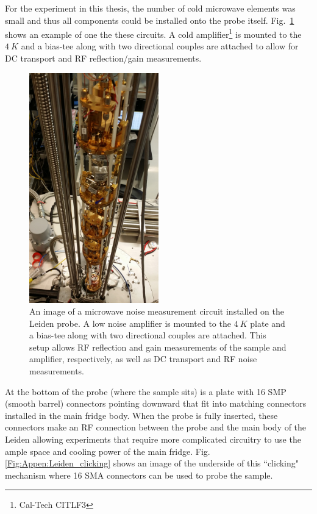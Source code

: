 For the experiment in this thesis, the number of cold microwave elements was small and thus all components could be installed onto the probe itself. Fig.~\ref{Fig:Appen:Leiden_probe} shows an example of one the these circuits. A cold amplifier\footnote{Cal-Tech CITLF$3$} is mounted to the $4~K$ and a bias-tee along with two directional couples are attached to allow for DC transport and RF reflection/gain measurements.

\begin{figure}
\centering
\includegraphics[angle=-90,width = 0.5\textwidth]{figures/appendix/cryostats/Leiden_probe.jpg}
\caption{An image of a microwave noise measurement circuit installed on the Leiden probe. A low noise amplifier is mounted to the $4~K$ plate and a bias-tee along with two directional couples are attached. This setup allows RF reflection and gain measurements of the sample and amplifier, respectively, as well as DC transport and RF noise measurements.}
\label{Fig:Appen:Leiden_probe}
\end{figure}

At the bottom of the probe (where the sample sits) is a plate with 16 SMP (smooth barrel) connectors pointing downward that fit into matching connectors installed in the main fridge body. When the probe is fully inserted, these connectors make an RF connection between the probe and the main body of the Leiden allowing experiments that require more complicated circuitry to use the ample space and cooling power of the main fridge. Fig. \ref{Fig:Appen:Leiden_clicking} shows an image of the underside of this ``clicking" mechanism where 16 SMA connectors can be used to probe the sample.

